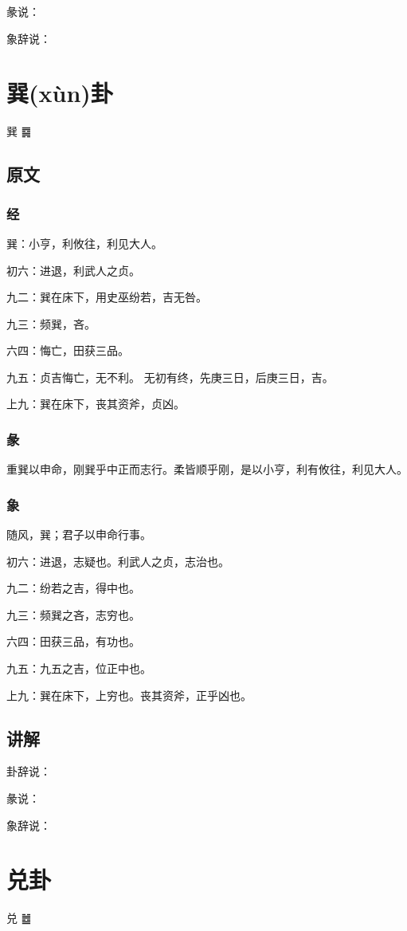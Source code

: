 \documentclass[12pt,oneside]{book}
\begin{document}
彖说：

象辞说：

\chapter{巽(xùn)卦}
巽 {\Large ䷸}

\section{原文}

\subsection{经}
巽：小亨，利攸往，利见大人。

初六：进退，利武人之贞。

九二：巽在床下，用史巫纷若，吉无咎。

九三：频巽，吝。

六四：悔亡，田获三品。

九五：贞吉悔亡，无不利。 无初有终，先庚三日，后庚三日，吉。

上九：巽在床下，丧其资斧，贞凶。

\subsection{彖}
重巽以申命，刚巽乎中正而志行。柔皆顺乎刚，是以小亨，利有攸往，利见大人。

\subsection{象}
随风，巽；君子以申命行事。

初六：进退，志疑也。利武人之贞，志治也。

九二：纷若之吉，得中也。

九三：频巽之吝，志穷也。

六四：田获三品，有功也。

九五：九五之吉，位正中也。

上九：巽在床下，上穷也。丧其资斧，正乎凶也。

\section{讲解}
卦辞说：

彖说：

象辞说：


\chapter{兑卦}
兑 {\Large ䷹}
\end{document}

